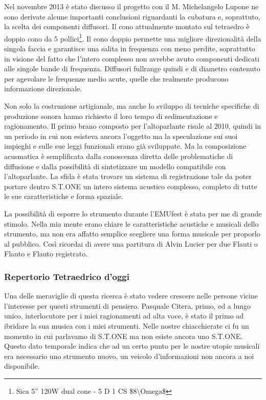 \documentclass[a4paper,11pt]{article}
\begin{document}
Nel novembre 2013 è stato discusso il progetto con il M. Michelangelo
Lupone ne sono derivate alcune importanti conclusioni riguardanti la
cubatura e, soprattuto, la scelta dei componenti diffusori. Il cono
attualmente montato sul tetraedro è doppio cono da 5 pollici\footnote{Sica 5'' 120W dual cone - 5 D 1 CS \$8\textbackslash{}Omega\$}. Il
cono doppio permette una migliore direzionalità della singola faccia e
garantisce una salita in frequenza con meno perdite, soprattutto in
visione del fatto che l'intero complesso non avrebbe avuto componenti
dedicati alle singole bande di frequenza. Diffusori fullrange quindi e
di diametro contenuto per agevolare le frequenze medio acute, quelle che
realmente producono informazione direzionale.

Non solo la costruzione artigianale, ma anche lo sviluppo di tecniche
specifiche di produzione sonora hanno richiesto il loro tempo di
sedimentazione e ragionamento. Il primo brano composto per
l'altoparlante risale al 2010, quindi in un periodo in cui non esisteva
ancora l'oggetto ma la speculazione sui suoi impieghi e sulle sue leggi
funzionali erano già sviluppate. Ma la composizione acusmatica è
semplificata dalla conoscenza diretta delle problematiche di diffusione
e dalla possibilità di sintetizzare un modello compatibile con
l'altoparlante. La sfida è stata trovare un sistema di registrazione
tale da poter portare dentro S.T.ONE un intero sistema acustico
complesso, completo di tutte le sue caratteristiche e forma spaziale.

La possibilità di esporre lo strumento durante l'EMUfest è stata per me
di grande stimolo. Nella mia mente erano chiare le caratteristiche
acustiche e musicali dello strumento, ma non era affatto semplice
scegliere una forma musicale per proporlo al pubblico. Così ricordai di
avere una partitura di Alvin Lucier per due Flauti o Flauto e Flauto
registrato.

\subsubsection{Repertorio Tetraedrico d'oggi}\hypertarget{repertorio-tetraedrico-doggi}{}\label{repertorio-tetraedrico-doggi}

Una delle meraviglie di questa ricerca è stato vedere crescere nelle
persone vicine l'interesse per questi strumenti di pensiero. Pasquale
Citera, primo, ed a lungo unico, interlocutore per i miei ragionamenti
ad alta voce, è stato il primo ad ibridare la sua musica con i miei
strumenti. Nelle nostre chiacchierate ci fu un momento in cui parlavamo
di S.T.ONE ma non esiste ancora uno S.T.ONE. Questo dato temporale
indica che ad un certo punto per le nostre utopie musicali era
necessario uno strumento nuovo, un veicolo d'informazioni non ancora a
noi disponibile.
\end{document}
